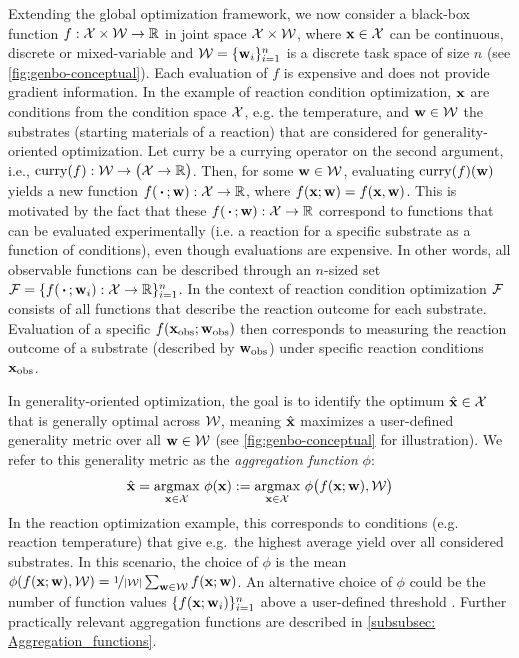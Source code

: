 Extending the global optimization framework, we now consider a black-box function $f: {\mathcal{X}} \times {\mathcal{W}} \rightarrow \mathbb{R}$ in joint space ${\mathcal{X}} \times {\mathcal{W}}$, where ${\mathbf{x}} \in {\mathcal{X}}$ can be continuous, discrete or mixed-variable and ${\mathcal{W}} = \{ \mathbf{w}_i \}_{i=1}^n$ is a discrete task space of size $n$ (see \cref{fig:genbo-conceptual}).
Each evaluation of $f$ is expensive and does not provide gradient information.
In the example of reaction condition optimization, ${\mathbf{x}}$ are conditions from the condition space ${\mathcal{X}}$, e.g. the  temperature, and ${\mathbf{w}} \in {\mathcal{W}}$ the substrates (starting materials of a reaction) that are considered for generality-oriented optimization.
Let \(\mathrm{curry}\) be a currying operator on the second argument, i.e., $\mathrm{curry}(f): {\mathcal{W}} \rightarrow \big( {\mathcal{X}} \rightarrow \mathbb{R} \big)$.
Then, for some ${\mathbf{w}} \in \mathcal{W}$, evaluating \(\mathrm{curry}(f)({\mathbf{w}})\) yields a new function $f (\,\boldsymbol{\cdot}\,; {\mathbf{w}}): {\mathcal{X}} \rightarrow \mathbb{R}$, where $f({\mathbf{x}}; {\mathbf{w}}) = f({\mathbf{x}}, {\mathbf{w}})$. 
This is motivated by the fact that these $f (\,\boldsymbol{\cdot}\,; {\mathbf{w}}) : {\mathcal{X}} \rightarrow \mathbb{R}$ correspond to functions that can be evaluated experimentally (i.e. a reaction for a specific substrate as a function of conditions), even though evaluations are expensive. 
In other words, all observable functions can be described through an $n$-sized set ${\mathcal{F}} = \{ f(\,\boldsymbol{\cdot}\,; {\mathbf{w}}_i): {\mathcal{X}} \rightarrow \mathbb{R} \}_{i=1}^{n}$.
In the context of reaction condition optimization ${\mathcal{F}}$ consists of all functions that describe the reaction outcome for each substrate.
Evaluation of a specific $f({\mathbf{x}}_\text{obs}; {\mathbf{w}}_\text{obs})$ then corresponds to measuring the reaction outcome of a substrate (described by ${\mathbf{w}}_\text{obs}$) under specific reaction conditions ${\mathbf{x}}_\text{obs}$.

In generality-oriented optimization, the goal is to identify the optimum $\hat{{\mathbf{x}}} \in {\mathcal{X}}$ that is generally optimal across ${\mathcal{W}}$, meaning $\hat{{\mathbf{x}}}$ maximizes a user-defined generality metric over all ${\mathbf{w}} \in {\mathcal{W}}$ (see \cref{fig:genbo-conceptual} for illustration). We refer to this generality metric as the \textit{aggregation function} $\phi$:
%
\begin{equation} \label{eq:aggrate-BO}
\hat{{\mathbf{x}}} = \underset{{\mathbf{x}} \in {\mathcal{X}}}{\text{argmax}} \ \phi({\mathbf{x}}) :=  \underset{{\mathbf{x}} \in {\mathcal{X}}}{\text{argmax}} \ \phi\big(f({\mathbf{x}}; {\mathbf{w}}), {\mathcal{W}}\big) 
\end{equation}
%
In the reaction optimization example, this corresponds to conditions (e.g. reaction temperature) that give e.g.\ the highest average yield over all considered substrates. 
In this scenario, the choice of $\phi$ is the mean $\phi(f({\mathbf{x}}; {\mathbf{w}}), \mathcal{W}) = \nicefrac{1}{|\mathcal{W}|} \sum_{{\mathbf{w}} \in \mathcal{W}} f({\mathbf{x}}; {\mathbf{w}})$. 
An alternative choice of $\phi$ could be the number of function values \(\{ f({\mathbf{x}}; {\mathbf{w}}_i) \}_{i=1}^n\) above a user-defined threshold \citep{betinol_data-driven_2023}.
Further practically relevant aggregation functions are described in \cref{subsubsec: Aggregation_functions}.

